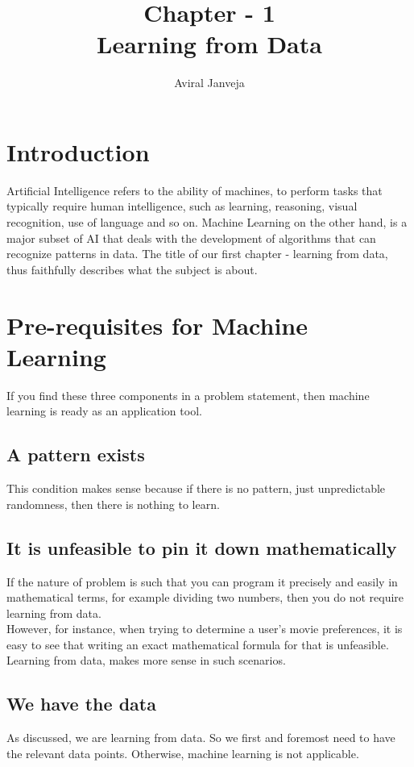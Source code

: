\documentclass[12pt, letterpaper]{article}
\title{\textbf{\Huge Chapter - 1 \\ Learning from Data}}
\author{Aviral Janveja}
\date{}
\begin{document}
\maketitle


\section{Introduction}

Artificial Intelligence refers to the ability of machines, to perform tasks that typically require human intelligence, such as learning, reasoning, visual recognition, use of language and so on. Machine Learning on the other hand, is a major subset of AI that deals with the development of algorithms that can recognize patterns in data. The title of our first chapter - learning from data, thus faithfully describes what the subject is about.


\section{Pre-requisites for Machine Learning}

If you find these three components in a problem statement, then machine learning is ready as an application tool.

\subsection{A pattern exists}
This condition makes sense because if there is no pattern, just unpredictable randomness, then there is nothing to learn.

\subsection{It is unfeasible to pin it down mathematically}
If the nature of problem is such that you can program it precisely and easily in mathematical terms, for example dividing two numbers, then you do not require learning from data.\\
However, for instance, when trying to determine a user's movie preferences, it is easy to see that writing an exact mathematical formula for that is unfeasible. Learning from data, makes more sense in such scenarios.

\subsection{We have the data}
As discussed, we are learning from data. So we first and foremost need to have the relevant data points. Otherwise, machine learning is not applicable. 
\end{document}
